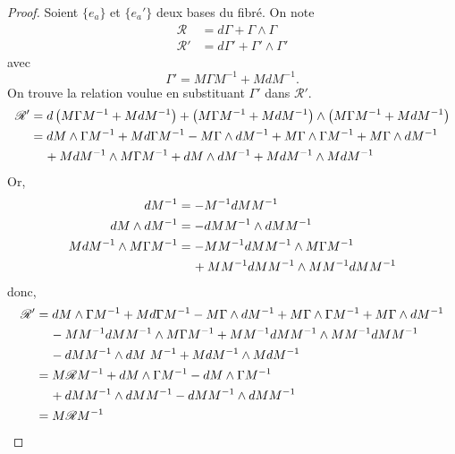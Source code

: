 \documentclass[a4paper,11pt]{report}
\begin{document}
                \begin{proof}
                    Soient $\{e_a\}$ et $\{e_a'\}$ deux bases du fibré. On note
                    \begin{align}
                        \mathscr{R} &= d\Gamma + \Gamma\wedge\Gamma \\
                        \mathscr{R}' &= d\Gamma' + \Gamma'\wedge\Gamma'
                    \end{align}
                    avec 
                    \begin{equation}
                        \Gamma' = M\Gamma M^{-1} + MdM^{-1}.
                    \end{equation}
                    On trouve la relation voulue en substituant $\Gamma'$ dans $\mathscr{R}'$.
                    \begin{align}
                        \mathscr{R}' &= d\left( M\Gamma M^{-1} + MdM^{-1} \right) + \left( M\Gamma M^{-1} + MdM^{-1} \right)\wedge\left( M\Gamma M^{-1} + MdM^{-1} \right) \\
                        &= dM\wedge\Gamma M^{-1}+Md\Gamma M^{-1}-M\Gamma\wedge dM^{-1}+M\Gamma\wedge\Gamma M^{-1} + M\Gamma\wedge dM^{-1} \\
                        &\hspace{0.4cm}+ MdM^{-1}\wedge M\Gamma M^{-1}+dM\wedge dM^{-1}+MdM^{-1}\wedge MdM^{-1}
                    \end{align}
                    Or,
                    \begin{align}
                        dM^{-1} &= -M^{-1}dMM^{-1}\\
                        dM\wedge dM^{-1} &= -dMM^{-1}\wedge dMM^{-1}\\
                        MdM^{-1}\wedge M\Gamma M^{-1} &= -MM^{-1}dMM^{-1}\wedge M\Gamma M^{-1}\\
                        &\hspace{0.4cm}+MM^{-1}dMM^{-1}\wedge MM^{-1}dMM^{-1}
                    \end{align}
                    donc,
                    \begin{align}
                        \mathscr{R}' &= dM\wedge\Gamma M^{-1}+Md\Gamma M^{-1}-M\Gamma\wedge dM^{-1}+M\Gamma\wedge\Gamma M^{-1} + M\Gamma\wedge dM^{-1} \\
                        &\hspace{0.4cm}-MM^{-1}dM M^{-1}\wedge M\Gamma M^{-1}+MM^{-1}dMM^{-1}\wedge MM^{-1}dMM^{-1}\\
                        &\hspace{0.4cm}-dMM^{-1}\wedge dM~ M^{-1}+MdM^{-1}\wedge MdM^{-1}\\
                        &= M\mathscr{R}M^{-1} + dM\wedge\Gamma M^{-1}-dM\wedge\Gamma M^{-1}\\
                        &\hspace{0.4cm}+ dMM^{-1}\wedge dMM^{-1}-dMM^{-1}\wedge dMM^{-1}\\
                        &= M\mathscr{R}M^{-1}
                    \end{align}
                \end{proof}
                
\end{document}
